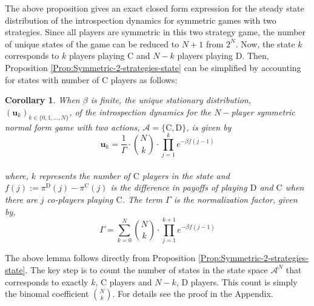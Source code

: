 \documentclass[11pt]{article}
\theoremstyle{plainCl1}
\theoremstyle{plainCl2}
\newtheorem{Corollary}{Corollary}
\newcommand{\ubf}{\mathbf{u}}
\newcommand{\C}{\mathrm{C}}
\newcommand{\D}{\mathrm{D}}
\begin{document}
\noindent The above proposition gives an exact closed form expression for the steady state distribution of the introspection dynamics for symmetric games with two strategies. Since all players are symmetric in this two strategy game, the number of unique states of the game can be reduced to $N+1$ from $2^N$. Now, the state $k$ corresponds to $k$ players playing $\C$ and $N-k$ players playing $\D$. Then, Proposition \ref{Prop:Symmetric-2-strategies-state} can be simplified by accounting for states with number of $\C$ players as follows:


\begin{Corollary}
\label{Lemma: Symmetric-2-stg}
When $\beta$ is finite, the unique stationary distribution, $(\ubf_k)_{k \in \{0,1,...,N\}}$, of the introspection dynamics for the $N-$player symmetric normal form game with two actions, $\mathcal{A} = \{\C, \D \}$, is given by \\
\begin{equation}
\label{Eq:stationary-dist-symm-2-stgs}
\ubf_k = \frac{1}{\Gamma} \cdot {N \choose k} \cdot \displaystyle \prod_{j=1}^{k} \displaystyle e^{-\beta f(j-1)}
\end{equation} \\ 
where, $k$ represents the number of $\C$ players in the state and $f(j) := \pi^\D(j) - \pi^\C(j)$ is the difference in payoffs of playing $\D$ and $\C$ when there are $j$ co-players playing $\C$. The term $\Gamma$ is the normalization factor, given by, \\
\begin{equation}
\label{Eq:normalization-Tk}
\Gamma = \displaystyle \sum_{k=0}^N {N \choose k} \cdot \displaystyle \prod_{j=1}^{k+1  } \displaystyle e^{-\beta f(j-1)}
\end{equation}
\end{Corollary}
\noindent The above lemma follows directly from Proposition \ref{Prop:Symmetric-2-strategies-state}. The key step is to count the number of states in the state space $\mathcal{A}^N$ that corresponds to exactly $k$, $\C$ players and $N-k$, $\D$ players. This count is simply the binomal coefficient $N \choose k$. For details see the proof in the Appendix. 
\newpage 
\end{document}
